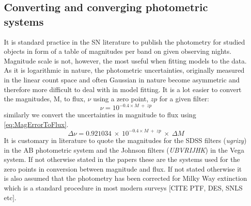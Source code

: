 \subsection{Converting and converging photometric systems}
It is standard practice in the SN literature to publish the photometry for studied objects in form of a table of magnitudes per band on given observing nights. Magnitude scale is not, however, the most useful when fitting models to the data. As it is logarithmic in nature, the photometric uncertainties, originally measured in the linear count space and often Gaussian in nature become asymmetric and therefore more difficult to deal with in model fitting. It is a lot easier to convert the magnitudes, M, to flux, $\nu$ using a zero point, $zp$ for a given filter:
\begin{equation}
\label{eq:MagToFlux}
\nu = 10^{-0.4 \times M~+~zp}
\end{equation}
similarly we convert the uncertainties in magnitude to flux using \eqref{eq:MagErrorToFlux}.
\begin{equation}
\label{eq:MagErrorToFlux}
\Delta \nu = 0.921034~\times~10^{-0.4 \times M~+~zp}~\times~\Delta M
\end{equation}
It is customary in literature to quote the magnitudes for the SDSS filters (\textit{ugrizy}) in the AB photometric system and the Johnson filters (\textit{UBVRIJHK}) in the Vega system. If not otherwise stated in the papers these are the systems used for the zero points in conversion between magnitude and flux. If not stated otherwise it is also assumed that the photometry has been corrected for Milky Way extinction which is a standard procedure in most modern surveys [CITE PTF, DES, SNLS etc].

